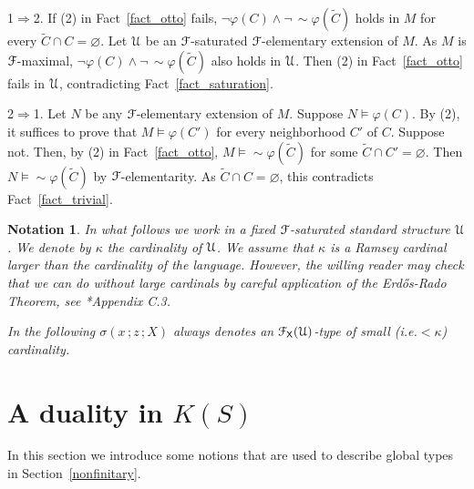 \documentclass{amsproc}
\makeatletter
\newcounter{thm}
\theoremstyle{mio}
\newtheorem{notation}[thm]{Notation}\tcolorboxenvironment{notation}{mythm}
\providecommand{\proofNameStyle}{\bfseries}
\renewenvironment{proof}[1][\proofname]{\par
  \pushQED{\qed}%
  \normalfont%
  \trivlist
  \item[\hskip\labelsep
        \proofNameStyle
    #1\@addpunct{.}]\ignorespaces
}{%
  \popQED\endtrivlist\@endpefalse
}
\makeatother
\begin{document}
\begin{proof}
  1$\Rightarrow$2.
  If (2) in Fact~\ref{fact_otto} fails, $\neg\varphi(C)\wedge\neg\,{\sim}\varphi(\tilde C)$ holds in $M$ for every $\tilde C\cap C=\varnothing$.
  Let ${\EuScript U}$ be an ${\EuScript F}$-saturated ${\EuScript F}$-elementary extension of $M$.
  As $M$ is ${\EuScript F}$-maximal, $\neg\varphi(C)\wedge\neg\,{\sim}\varphi(\tilde C)$ also holds in ${\EuScript U}$.
  Then (2) in Fact~\ref{fact_otto} fails in ${\EuScript U}$, contradicting Fact~\ref{fact_saturation}.

  2$\Rightarrow$1. 
  Let $N$ be any ${\EuScript F}$-elementary extension of $M$.
  Suppose $N\models\varphi(C)$.
  By (2), it suffices to prove that $M\models\varphi(C')$ for every neighborhood $C'$ of $C$.
  Suppose not.
  Then, by (2) in Fact~\ref{fact_otto}, $M\models{\sim}\varphi(\tilde C)$ for some $\tilde C\cap C'=\varnothing$.
  Then $N\models{\sim}\varphi(\tilde C)$ by ${\EuScript F}$-elementarity.
  As $\tilde C\cap C=\varnothing$, this contradicts Fact~\ref{fact_trivial}.
\end{proof}

\begin{notation}
  In what follows we work in a fixed ${\EuScript F}$-saturated standard structure ${\EuScript U}$.
  We denote by $\kappa$ the cardinality of ${\EuScript U}$.
  We assume that $\kappa$ is a Ramsey cardinal larger than the cardinality of the language.
  However, the willing reader may check that we can do without large cardinals by careful application of the Erd\H{o}s-Rado Theorem, see \cite{TZ}*{Appendix C.3}.\smallskip

  In the following $\sigma(x\,;z\,;X)$ always denotes an ${\EuScript F}_{\sf X}({\EuScript U})$-type of small (i.e.\@ $<\kappa$) cardinality.
\end{notation}


\section{A duality in \boldmath$K(S)$}\label{K(S)}

\def\medrel#1{\parbox{5ex}{\hfil $#1$}}
\def\ceq#1#2#3{\parbox[t]{23ex}{$\displaystyle #1$}\medrel{#2}{$\displaystyle #3$}}

In this section we introduce some notions that are used to describe global types in Section~\ref{nonfinitary}.
\end{document}
